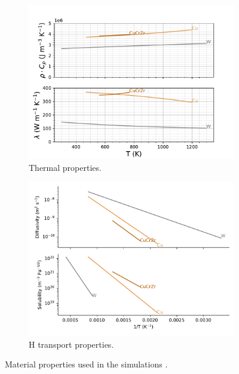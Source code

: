 \begin{figure}
    \centering
    \begin{subfigure}{\linewidth}
        \centering
        \includegraphics[width=\linewidth]{Figures/Chapter3/monoblocks/interface_condition/iter case/thermal_prop.pdf}
        \caption{Thermal properties.}
    \end{subfigure}
    \begin{subfigure}{\linewidth}
        \centering
        \includegraphics[width=\linewidth]{Figures/Chapter3/monoblocks/monoblock_H_transport_properties.pdf}
        \caption{H transport properties.}
    \end{subfigure}
    \caption{Material properties used in the simulations \cite{frauenfelder_solution_1969, reiter_compilation_1996, serra_hydrogen_1998, aiello_hydrogen_2002}.}
\end{figure}

